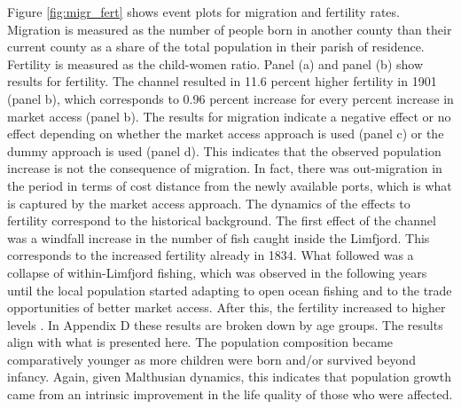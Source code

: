 \documentclass[11pt]{article}
\begin{document}
Figure \ref{fig:migr_fert} shows event plots for migration and fertility rates. Migration is measured as the number of people born in another county than their current county as a share of the total population in their parish of residence. Fertility is measured as the child-women ratio. Panel (a) and panel (b) show results for fertility. The channel resulted in 11.6 percent higher fertility in 1901 (panel b), which corresponds to 0.96 percent increase for every percent increase in market access (panel b). The results for migration indicate a negative effect or no effect depending on whether the market access approach is used (panel c) or the dummy approach is used (panel d). This indicates that the observed population increase is not the consequence of migration. In fact, there was out-migration in the period in terms of cost distance from the newly available ports, which is what is captured by the market access approach. The dynamics of the effects to fertility correspond to the historical background. The first effect of the channel was a windfall increase in the number of fish caught inside the Limfjord. This corresponds to the increased fertility already in 1834. What followed was a collapse of within-Limfjord fishing, which was observed in the following years until the local population started adapting to open ocean fishing and to the trade opportunities of better market access. After this, the fertility increased to higher levels \citep{Poulsen2007, Poulsen2022}. In Appendix D these results are broken down by age groups. The results align with what is presented here. The population composition became comparatively younger as more children were born and/or survived beyond infancy. Again, given Malthusian dynamics, this indicates that population growth came from an intrinsic improvement in the life quality of those who were affected. 
\end{document}
